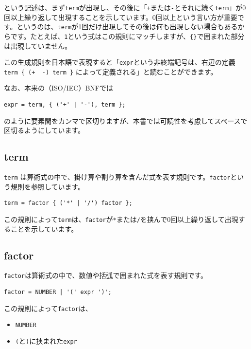 という記述は、まず\texttt{term}が出現し、その後に「\texttt{+}または\texttt{-}とそれに続く\texttt{term}」が0回以上繰り返して出現することを示しています。0回以上という言い方が重要です。というのは、\texttt{term}が1回だけ出現してその後は何も出現しない場合もあるからです。たとえば、\texttt{1}という式はこの規則にマッチしますが、\texttt{\{\}}で囲まれた部分は出現していません。

この生成規則を日本語で表現すると「\texttt{expr}という非終端記号は、右辺の定義
\texttt{term\ \{\ (\textquotesingle{}+\textquotesingle{}\ \textbar{}\ \textquotesingle{}-\textquotesingle{})\ term\ \}}
によって定義される」と読むことができます。

なお、本来の（ISO/IEC）BNFでは

\begin{verbatim}
expr = term, { ('+' | '-'), term };
\end{verbatim}

のように要素間をカンマで区切りますが、本書では可読性を考慮してスペースで区切るようにしています。

\hypertarget{chapter2-term}{%
\subsection{term}\label{chapter2-term}}

\texttt{term}
は算術式の中で、掛け算や割り算を含んだ式を表す規則です。\texttt{factor}という規則を参照しています。

\begin{verbatim}
term = factor { ('*' | '/') factor };
\end{verbatim}

この規則によって\texttt{term}は、\texttt{factor}が\texttt{*}または\texttt{/}を挟んで0回以上繰り返して出現することを示しています。

\hypertarget{chapter2-factor}{%
\subsection{factor}\label{chapter2-factor}}

\texttt{factor}は算術式の中で、数値や括弧で囲まれた式を表す規則です。

\begin{verbatim}
factor = NUMBER | '(' expr ')';
\end{verbatim}

この規則によって\texttt{factor}は、

\begin{itemize}
\tightlist
\item
  \texttt{NUMBER}
\item
  \texttt{(}と\texttt{)}に挟まれた\texttt{expr}
\end{itemize}

